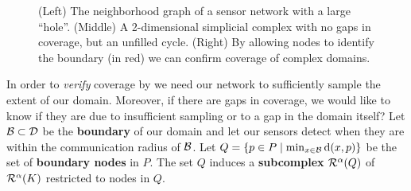 \begin{figure}[htbp]
     \caption{(Left) The neighborhood graph of a sensor network with a large ``hole''.
            (Middle) A 2-dimensional simplicial complex with no gaps in coverage, but an unfilled cycle.
            (Right) By allowing nodes to identify the boundary (in red) we can confirm coverage of complex domains.}
     \label{fig:boundary1}
 \end{figure}

In order to \textit{verify} coverage by we need our network to sufficiently sample the extent of our domain.
Moreover, if there are gaps in coverage, we would like to know if they are due to insufficient sampling or to a gap in the domain itself?
Let ${\mathcal{B}}\subset{\mathcal{D}}$ be the \textbf{boundary} of our domain and let our sensors detect when they are within the communication radius of ${\mathcal{B}}$.
Let $Q = \{p\in P\mid \min_{x\in{\mathcal{B}}}\mathrm{d}(x, p)\}$ be the set of \textbf{boundary nodes} in $P$.
The set $Q$ induces a \textbf{subcomplex} $\mathcal{R}^\alpha(Q)$ of $\mathcal{R}^\alpha(K)$ restricted to nodes in $Q$.



